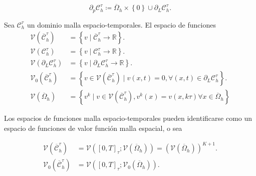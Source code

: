 \begin{definition}
    \begin{equation*}
        \partial_{p}
        \mathcal{C}^{\tau}_{h}\coloneqq
        \overline{\Omega}_{h}\times
        \left\{0\right\}\cup
        \partial_{L}
        \mathcal{C}^{\tau}_{h}.
    \end{equation*}
\end{definition}

\begin{definition}
    Sea $\mathcal{C}^{\tau}_{h}$ un dominio malla espacio-temporales.
    El espacio de funciones
    \begin{align*}
        \mathcal{V}
        \left(
        \overline{\mathcal{C}}^{\tau}_{h}
        \right) & =
        \left\{
        v\mid
        \overline{\mathcal{C}}^{\tau}_{h}\to\mathbb{R}
        \right\}.   \\
        \mathcal{V}
        \left(
        \mathcal{C}^{\tau}_{h}
        \right) & =
        \left\{
        v\mid
        \mathcal{C}^{\tau}_{h}\to\mathbb{R}
        \right\}.   \\
        \mathcal{V}
        \left(
        \partial_{L}\mathcal{C}^{\tau}_{h}
        \right) & =
        \left\{
        v\mid
        \partial_{L}\mathcal{C}^{\tau}_{h}\to\mathbb{R}
        \right\}.   \\
        \mathcal{V}_{0}
        \left(
        \overline{\mathcal{C}}^{\tau}_{h}
        \right) & =
        \left\{
        v\in
        \mathcal{V}\left(\overline{\mathcal{C}}^{\tau}_{h}\right)\mid
        v\left(x,t\right)=0,
        \forall\left(x,t\right)\in\partial_{L}\mathcal{C}^{\tau}_{h}
        \right\}.   \\
        \mathcal{V}
        \left(
        \overline{\Omega}_{h}
        \right) & =
        \left\{
        v^{k}\mid
        v\in
        \mathcal{V}
        \left(
        \overline{\mathcal{C}}^{\tau}_{h}
        \right),
        v^{k}\left(x\right)=
        v\left(x,k\tau\right)
        \forall x\in\overline{\Omega}_{h}
        \right\}
    \end{align*}
\end{definition}

Los espacios de funciones malla espacio-temporales pueden
identificarse como un espacio de funciones de valor función malla
espacial, o sea

\begin{align*}
    \mathcal{V}
    \left(
    \overline{\mathcal{C}}^{\tau}_{h}
    \right) & =
    \mathcal{V}
    \left(
    \left[0,T\right]_{\tau};
    \mathcal{V}
    \left(\overline{\Omega}_{h}\right)
    \right)=
    {
    \left(
    \mathcal{V}\left(\overline{\Omega}_{h}\right)
    \right)
    }^{K+1}.    \\
    \mathcal{V}_{0}
    \left(
    \overline{\mathcal{C}}^{\tau}_{h}
    \right) & =
    \mathcal{V}
    \left(
    \left[0,T\right]_{\tau};
    \mathcal{V}_{0}\left(\overline{\Omega}_{h}\right)
    \right).
\end{align*}

